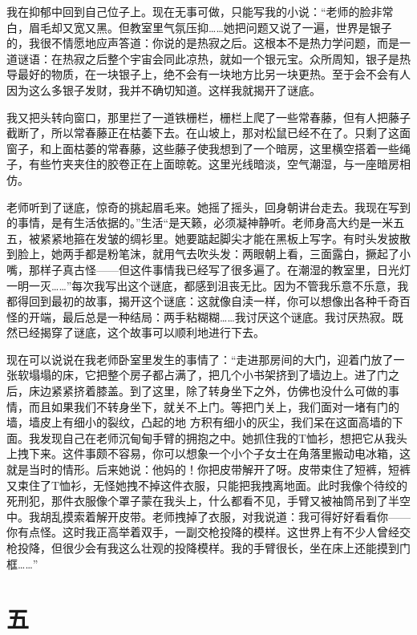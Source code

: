 我在抑郁中回到自己位子上。现在无事可做，只能写我的小说：“老师的脸非常白，眉毛却又宽又黑。但教室里气氛压抑……她把问题又说了一遍，世界是银子的，我很不情愿地应声答道：你说的是热寂之后。这根本不是热力学问题，而是一道谜语：在热寂之后整个宇宙会同此凉热，就如一个银元宝。众所周知，银子是热导最好的物质，在一块银子上，绝不会有一块地方比另一块更热。至于会不会有人因为这么多银子发财，我并不确切知道。这样我就揭开了谜底。 

我又把头转向窗口，那里拦了一道铁栅栏，栅栏上爬了一些常春藤，但有人把藤子截断了，所以常春藤正在枯萎下去。在山坡上，那对松鼠已经不在了。只剩了这面窗子，和上面枯萎的常春藤，这些藤子使我想到了一个暗房，这里横空搭着一些绳子，有些竹夹夹住的胶卷正在上面晾乾。这里光线暗淡，空气潮湿，与一座暗房相仿。 

老师听到了谜底，惊奇的挑起眉毛来。她摇了摇头，回身朝讲台走去。我现在写到的事情，是有生活依据的。”生活“是天籁，必须凝神静听。老师身高大约是一米五五，被紧紧地箍在发皱的绸衫里。她要踮起脚尖才能在黑板上写字。有时头发披散到脸上，她两手都是粉笔沫，就用气去吹头发：两眼朝上看，三面露白，撅起了小嘴，那样子真古怪——但这件事情我已经写了很多遍了。在潮湿的教室里，日光灯一明一灭……”每次我写出这个谜底，都感到沮丧无比。因为不管我乐意不乐意，我都得回到最初的故事，揭开这个谜底：这就像自渎一样，你可以想像出各种千奇百怪的开端，最后总是一种结局：两手粘糊糊……我讨厌这个谜底。我讨厌热寂。既然已经揭穿了谜底，这个故事可以顺利地进行下去。 

现在可以说说在我老师卧室里发生的事情了：“走进那房间的大门，迎着门放了一张软塌塌的床，它把整个房子都占满了，把几个小书架挤到了墙边上。进了门之后，床边紧紧挤着膝盖。到了这里，除了转身坐下之外，仿佛也没什么可做的事情，而且如果我们不转身坐下，就关不上门。等把门关上，我们面对一堵有门的墙，墙皮上有细小的裂纹，凸起的地 方积有细小的灰尘，我们呆在这面高墙的下面。我发现自己在老师沉甸甸手臂的拥抱之中。她抓住我的T恤衫，想把它从我头上拽下来。这件事颇不容易，你可以想象一个小个子女士在角落里搬动电冰箱，这就是当时的情形。后来她说：他妈的！你把皮带解开了呀。皮带束住了短裤，短裤又束住了T恤衫，无怪她拽不掉这件衣服，只能把我拽离地面。此时我像个待绞的死刑犯，那件衣服像个罩子蒙在我头上，什么都看不见，手臂又被袖筒吊到了半空中。我胡乱摸索着解开皮带。老师拽掉了衣服，对我说道：我可得好好看看你——你有点怪。这时我正高举着双手，一副交枪投降的模样。这世界上有不少人曾经交枪投降，但很少会有我这么壮观的投降模样。我的手臂很长，坐在床上还能摸到门框……” 


\section*{五} 

